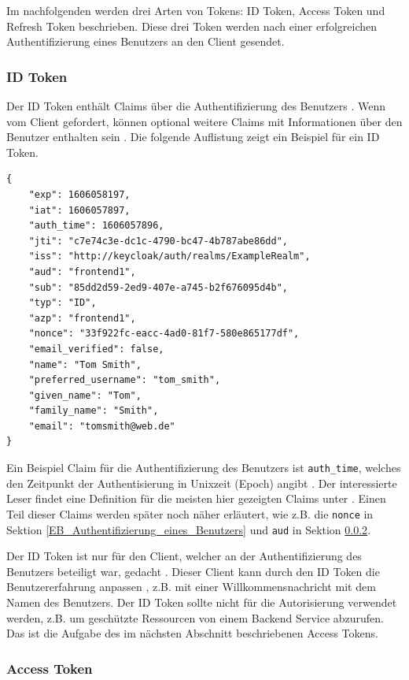 Im nachfolgenden werden drei Arten von Tokens: ID Token, Access Token und Refresh Token beschrieben. Diese drei Token werden nach einer erfolgreichen Authentifizierung eines Benutzers an den Client gesendet.

\subsubsection{ID Token}

Der ID Token enthält Claims über die Authentifizierung des Benutzers \cite[ID Token]{EB4}. Wenn vom Client gefordert, können optional weitere Claims mit Informationen über den Benutzer enthalten sein \cite[ID Token]{EB4}. Die folgende Auflistung zeigt ein Beispiel für ein ID Token.

\begin{lstlisting}[caption=Beispiel ID Token, captionpos=b]
{
	"exp": 1606058197,
	"iat": 1606057897,
	"auth_time": 1606057896,
	"jti": "c7e74c3e-dc1c-4790-bc47-4b787abe86dd",
	"iss": "http://keycloak/auth/realms/ExampleRealm",
	"aud": "frontend1",
	"sub": "85dd2d59-2ed9-407e-a745-b2f676095d4b",
	"typ": "ID",
	"azp": "frontend1",
	"nonce": "33f922fc-eacc-4ad0-81f7-580e865177df",
	"email_verified": false,
	"name": "Tom Smith",
	"preferred_username": "tom_smith",
	"given_name": "Tom",
	"family_name": "Smith",
	"email": "tomsmith@web.de"
}
\end{lstlisting}

Ein Beispiel Claim für die Authentifizierung des Benutzers ist \texttt{auth\_time}, welches den Zeitpunkt der Authentisierung in Unixzeit (Epoch) angibt \cite[ID Token]{EB4}. Der interessierte Leser findet eine Definition für die meisten hier gezeigten Claims unter \cite{EB7}. Einen Teil dieser Claims werden später noch näher erläutert, wie z.B. die \texttt{nonce} in Sektion \ref{EB_Authentifizierung_eines_Benutzers} und \texttt{aud} in Sektion \ref{EB_AccessToken}.

Der ID Token ist nur für den Client, welcher an der Authentifizierung des Benutzers beteiligt war, gedacht \cite{EB59}. Dieser Client kann durch den ID Token die Benutzererfahrung anpassen \cite[ID tokens]{EB8}, z.B. mit einer Willkommensnachricht mit dem Namen des Benutzers. Der ID Token sollte nicht für die Autorisierung verwendet werden, z.B. um geschützte Ressourcen von einem Backend Service abzurufen. Das ist die Aufgabe des im nächsten Abschnitt beschriebenen Access Tokens.

\subsubsection{Access Token} \label{EB_AccessToken}

